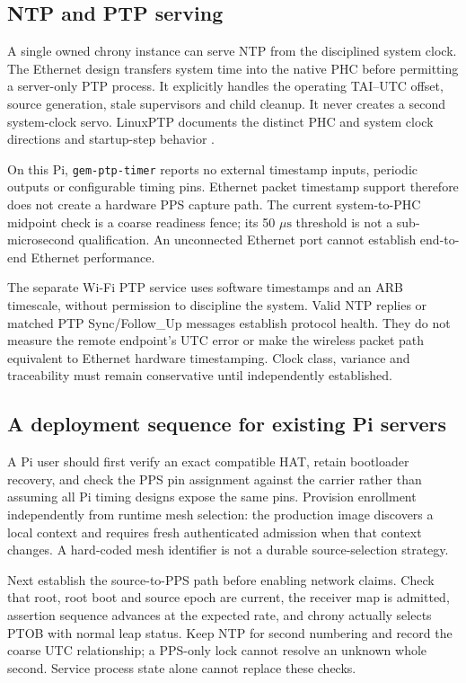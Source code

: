 \documentclass[10pt,letterpaper]{article}
\newcommand{\code}[1]{\texttt{\small #1}}
\newcommand{\us}{\ensuremath{\mu\mathrm{s}}}
\begin{document}
\subsection{NTP and PTP serving}
A single owned chrony instance can serve NTP from the disciplined system clock.
The Ethernet design transfers system time into the native PHC before permitting
a server-only PTP process. It explicitly handles the operating TAI--UTC offset,
source generation, stale supervisors and child cleanup. It never creates a
second system-clock servo. LinuxPTP documents the distinct PHC and system clock
directions and startup-step behavior \cite{phc2sys}.

On this Pi, \code{gem-ptp-timer} reports no external timestamp inputs, periodic
outputs or configurable timing pins. Ethernet packet timestamp support therefore
does not create a hardware PPS capture path. The current system-to-PHC
midpoint check is a coarse readiness fence; its 50 \us{} threshold is not a
sub-microsecond qualification. An unconnected Ethernet port cannot establish
end-to-end Ethernet performance.

The separate Wi-Fi PTP service uses software timestamps and an ARB timescale,
without permission to discipline the system. Valid NTP replies or matched PTP
Sync/Follow\_Up messages establish protocol health. They do not measure the
remote endpoint's UTC error or make the wireless packet path equivalent to
Ethernet hardware timestamping. Clock class, variance and traceability must
remain conservative until independently established.

\subsection{A deployment sequence for existing Pi servers}
A Pi user should first verify an exact compatible HAT, retain bootloader recovery,
and check the PPS pin assignment against the carrier rather than assuming all
Pi timing designs expose the same pins. Provision enrollment independently from
runtime mesh selection: the production image discovers a local context and
requires fresh authenticated admission when that context changes. A hard-coded
mesh identifier is not a durable source-selection strategy.

Next establish the source-to-PPS path before enabling network claims. Check that
root, root boot and source epoch are current, the receiver map is admitted,
assertion sequence advances at the expected rate, and chrony actually selects
PTOB with normal leap status. Keep NTP for second numbering and record the
coarse UTC relationship; a PPS-only lock cannot resolve an unknown whole second.
Service process state alone cannot replace these checks.
\end{document}
